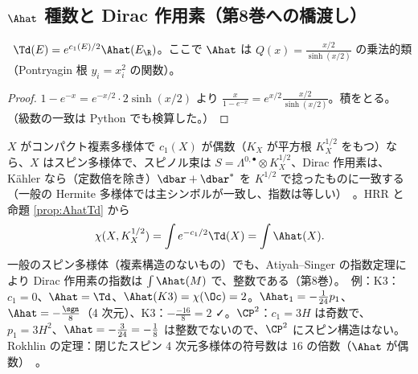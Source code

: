 \subsection{$\Ahat$ 種数と Dirac 作用素（第8巻への橋渡し）}
\begin{prop}\label{prop:AhatTd}\tP\ $\Td(E)=e^{c_1(E)/2}\Ahat(E_\R)$。ここで $\Ahat$ は $Q(x)=\frac{x/2}{\sinh(x/2)}$ の乗法的類（Pontryagin 根 $y_i=x_i^2$ の関数）。
\end{prop}
\begin{proof}
$1-e^{-x}=e^{-x/2}\cdot2\sinh(x/2)$ より $\frac x{1-e^{-x}}=e^{x/2}\frac{x/2}{\sinh(x/2)}$。積をとる。（級数の一致は Python でも検算した。）
\end{proof}
\noindent $X$ がコンパクト複素多様体で $c_1(X)$ が偶数（$K_X$ が平方根 $K_X^{1/2}$ をもつ）なら、$X$ はスピン多様体で、スピノル束は $S=\Lambda^{0,\bullet}\otimes K_X^{1/2}$、Dirac 作用素は、Kähler なら（定数倍を除き）$\dbar+\dbar^*$ を $K^{1/2}$ で捻ったものに一致する（一般の Hermite 多様体では主シンボルが一致し、指数は等しい）\tC\ 。HRR と命題 \ref{prop:AhatTd} から
\[
\chi(X,K_X^{1/2})=\int e^{-c_1/2}\Td(X)=\int\Ahat(X).
\]
一般のスピン多様体（複素構造のないもの）でも、Atiyah--Singer の指数定理により Dirac 作用素の指数は $\int\Ahat(M)$ で、整数である（第8巻）。\tC\ 例：K3：$c_1=0$、$\Ahat=\Td$、$\Ahat(K3)=\chi(\Oc)=2$。$\Ahat_1=-\frac1{24}p_1$、$\Ahat=-\frac{\sgn}8$（4 次元）、K3：$-\frac{-16}8=2$ ✓。$\CP^2$：$c_1=3H$ は奇数で、$p_1=3H^2$、$\Ahat=-\frac3{24}=-\frac18$ は整数でないので、$\CP^2$ にスピン構造はない。Rokhlin の定理：閉じたスピン 4 次元多様体の符号数は $16$ の倍数（$\Ahat$ が偶数）\tC\ 。

